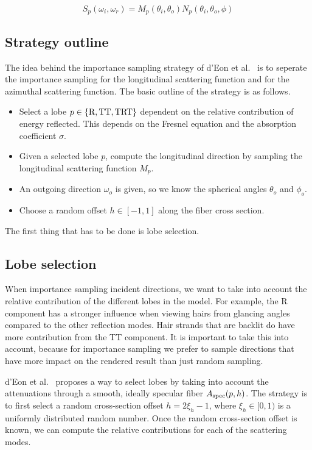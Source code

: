 \documentclass[11pt,a4paper]{report}
\begin{document}
\begin{equation}
S_p(\omega_i, \omega_r) = M_p(\theta_i, \theta_o) N_p(\theta_i, \theta_o, \phi)
\end{equation}

\subsection{Strategy outline}

The idea behind the importance sampling strategy of d'Eon et al.~\cite{eon2013} is to seperate the importance sampling for the longitudinal scattering function and for the azimuthal scattering function. The basic outline of the strategy is as follows.

\begin{itemize}
\item Select a lobe $p \in \{ \textnormal{R}, \textnormal{TT}, \textnormal{TRT} \}$ dependent on the relative contribution of energy reflected. This depends on the Fresnel equation and the absorption coefficient $\sigma$.
\item Given a selected lobe $p$, compute the longitudinal direction by sampling the longitudinal scattering function $M_p$.
\item An outgoing direction $\omega_o$ is given, so we know the spherical angles $\theta_o$ and $\phi_o$.
\item Choose a random offset $h \in [-1, 1]$ along the fiber cross section.
\end{itemize}

The first thing that has to be done is lobe selection.

\subsection{Lobe selection}
\label{sec_lobe_selection}

When importance sampling incident directions, we want to take into account the relative contribution of the different lobes in the model. For example, the R component has a stronger influence when viewing hairs from glancing angles compared to the other reflection modes. Hair strands that are backlit do have more contribution from the TT component. It is important to take this into account, because for importance sampling we prefer to sample directions that have more impact on the rendered result than just random sampling.

d'Eon et al.~\cite{eon2013} proposes a way to select lobes by taking into account the attenuations through a smooth, ideally specular fiber $A_{\textnormal{spec}}(p, h)$. The strategy is to first select a random cross-section offset $h = 2\xi_h - 1$,  where $\xi_h \in [0, 1)$ is a uniformly distributed random number. Once the random cross-section offset is known, we can compute the relative contributions for each of the scattering modes.
\end{document}
